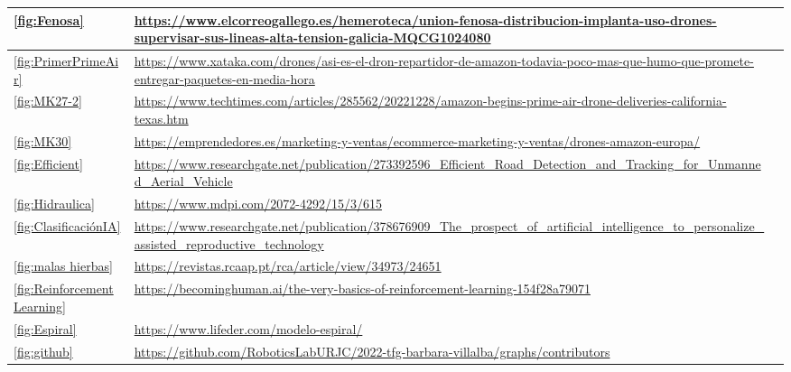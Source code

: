 \begin{tabular}{ | m{4cm} | m{10cm}| m{1cm} | }
   
   
\end{tabular}

\begin{tabular}{ | m{4cm} | m{10cm}| m{1cm} | }

    \hline 
    \ref{fig:Fenosa} & \url{https://www.elcorreogallego.es/hemeroteca/union-fenosa-distribucion-implanta-uso-drones-supervisar-sus-lineas-alta-tension-galicia-MQCG1024080} \\
    \hline
    \ref{fig:PrimerPrimeAir} & \url{https://www.xataka.com/drones/asi-es-el-dron-repartidor-de-amazon-todavia-poco-mas-que-humo-que-promete-entregar-paquetes-en-media-hora} \\ 
    \hline
    \ref{fig:MK27-2} & \url{https://www.techtimes.com/articles/285562/20221228/amazon-begins-prime-air-drone-deliveries-california-texas.htm} \\
    \hline
    \ref{fig:MK30} & \url{https://emprendedores.es/marketing-y-ventas/ecommerce-marketing-y-ventas/drones-amazon-europa/} \\
    \hline
    \ref{fig:Efficient} & \url{https://www.researchgate.net/publication/273392596_Efficient_Road_Detection_and_Tracking_for_Unmanned_Aerial_Vehicle} \\
    \hline
    \ref{fig:Hidraulica} & \url{https://www.mdpi.com/2072-4292/15/3/615} \\
    \hline
    \ref{fig:ClasificaciónIA} & \url{https://www.researchgate.net/publication/378676909_The_prospect_of_artificial_intelligence_to_personalize_assisted_reproductive_technology} \\
    \hline
    \ref{fig:malas hierbas} & \url{https://revistas.rcaap.pt/rca/article/view/34973/24651} \\
    \hline
    \ref{fig:Reinforcement Learning} & \url{https://becominghuman.ai/the-very-basics-of-reinforcement-learning-154f28a79071} \\
    \hline
    \ref{fig:Espiral} & \url{https://www.lifeder.com/modelo-espiral/} \\
    \hline 
    \ref{fig:github} & \url{https://github.com/RoboticsLabURJC/2022-tfg-barbara-villalba/graphs/contributors} \\
    \hline  



\end{tabular}



